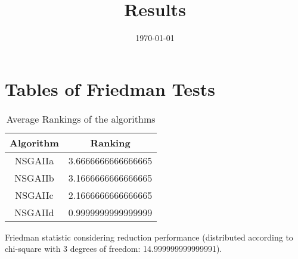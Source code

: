 \documentclass{article}
\title{Results}
\author{}
\date{\today}
\begin{document}
\oddsidemargin 0in \topmargin 0in\maketitle
\section{Tables of Friedman Tests}
\begin{table}[!htp]
\centering
\caption{Average Rankings of the algorithms
}\begin{tabular}{c|c}
Algorithm&Ranking\\
\hline
NSGAIIa&3.6666666666666665\\
NSGAIIb&3.1666666666666665\\
NSGAIIc&2.1666666666666665\\
NSGAIId&0.9999999999999999\\
\end{tabular}
\end{table}


Friedman statistic considering reduction performance (distributed according to chi-square with 3 degrees of freedom: 14.999999999999991).
\end{document}
